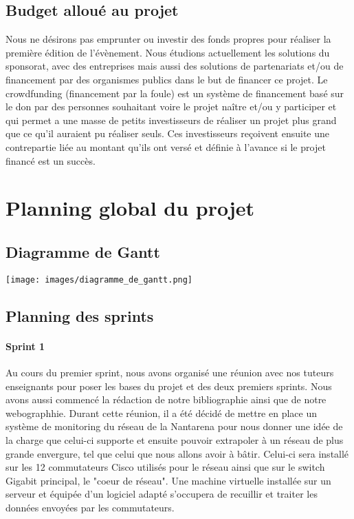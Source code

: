 \documentclass[french]{article}
\newenvironment{changemargin}[2]{\begin{list}{}{%
\setlength{\topsep}{0pt}%
\setlength{\leftmargin}{0pt}%
\setlength{\rightmargin}{0pt}%
\setlength{\listparindent}{\parindent}%
\setlength{\itemindent}{\parindent}%
\setlength{\parsep}{0pt plus 1pt}%
\addtolength{\leftmargin}{#1}%
\addtolength{\rightmargin}{#2}%
}\item }{\end{list}}
\begin{document}
\subsection{Budget alloué au projet}

Nous ne désirons pas emprunter ou investir des fonds propres pour réaliser la première édition de l'évènement.
Nous étudions actuellement les solutions du sponsorat, avec des entreprises mais aussi des solutions de partenariats et/ou de financement par des organismes publics dans le but de financer ce projet.
Le crowdfunding (financement par la foule) est un système de financement basé sur le don par des personnes souhaitant voire le projet naître et/ou y participer et qui permet a une masse de petits investisseurs de réaliser un projet plus grand que ce qu'il auraient pu réaliser seuls. Ces investisseurs reçoivent ensuite une contrepartie liée au montant qu'ils ont versé et définie à l'avance si le projet financé est un succès.


\section{Planning global du projet}

\subsection{Diagramme de Gantt}
\begin{changemargin}{-4cm}{-4cm}
	\begin{center}
	\texttt{[image: images/diagramme\_de\_gantt.png]}
    \end{center}
\end{changemargin}

\newpage

\subsection{Planning des sprints}

\paragraph{Sprint 1}
Au cours du premier sprint, nous avons organisé une réunion avec nos tuteurs enseignants pour poser les bases du projet et des deux premiers sprints. Nous avons aussi commencé la rédaction de notre bibliographie ainsi que de notre webographhie.
Durant cette réunion, il a été décidé de mettre en place un système de monitoring du réseau de la Nantarena pour nous donner une idée de la charge que celui-ci supporte et ensuite pouvoir extrapoler à un réseau de plus grande envergure, tel que celui que nous allons avoir à bâtir.
Celui-ci sera installé sur les 12 commutateurs Cisco utilisés pour le réseau ainsi que sur le switch Gigabit principal, le "coeur de réseau".
Une machine virtuelle installée sur un serveur et équipée d'un logiciel adapté s'occupera de recuillir et traiter les données envoyées par les commutateurs.
\end{document}
